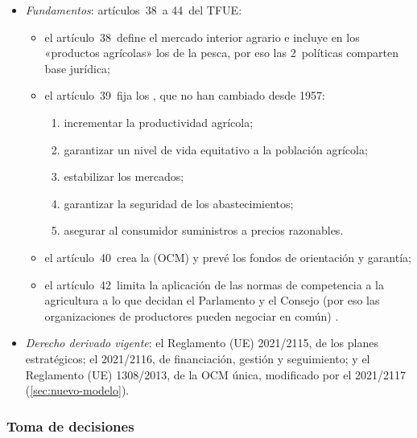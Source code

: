 \documentclass[11pt]{article}
\begin{document}
\begin{itemize}
\item \emph{Fundamentos}: artículos~38~a 44~del TFUE\nocite{UE2016TFUE}:
  \begin{itemize}
  \item el artículo~38~define el mercado interior agrario e incluye en los «productos agrícolas» los de la pesca, por eso las 2~políticas comparten base jurídica;
  \item el artículo~39~fija los , que no han cambiado desde 1957:
    \begin{enumerate}
    \item incrementar la productividad agrícola;
    \item garantizar un nivel de vida equitativo a la población agrícola;
    \item estabilizar los mercados;
    \item garantizar la seguridad de los abastecimientos;
    \item asegurar al consumidor suministros a precios razonables.
    \end{enumerate}
  \item el artículo~40~crea la  (OCM) y prevé los fondos de orientación y garantía;
  \item el artículo~42~limita la aplicación de las normas de competencia a la agricultura a lo que decidan el Parlamento y el Consejo (por eso las organizaciones de productores pueden negociar en común) .
  \end{itemize}
\item \emph{Derecho derivado vigente}: el Reglamento (UE) 2021/2115, de los planes estratégicos; el 2021/2116, de financiación, gestión y seguimiento; y el Reglamento (UE) 1308/2013, de la OCM única, modificado por el 2021/2117 (\ref{sec:nuevo-modelo})\nocite{UE2021PlanesEstrategicos,UE2021Horizontal,UE2013OCM}.
\end{itemize}

\subsubsection{Toma de decisiones}\label{sec:decision-pac}
\end{document}
